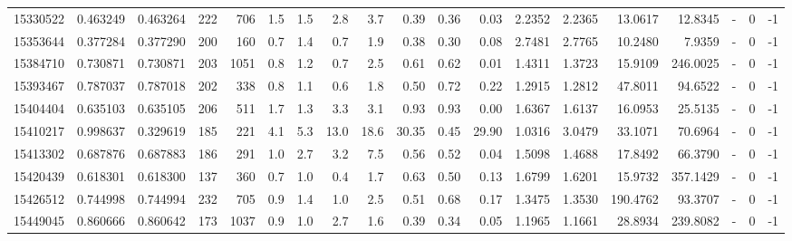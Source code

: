 \begin{tabular}{rrrrrrrrrrrrrrrrlrr}
  15330522 & 0.463249 &   0.463264 &  222 &  706 &      1.5 &      1.5 &     2.8 &      3.7 &       0.39 &        0.36 &        0.03 &  2.2352 &  2.2365 &   13.0617 &   12.8345 &             - &        0 &         -1 \\
  15353644 & 0.377284 &   0.377290 &  200 &  160 &      0.7 &      1.4 &     0.7 &      1.9 &       0.38 &        0.30 &        0.08 &  2.7481 &  2.7765 &   10.2480 &    7.9359 &             - &        0 &         -1 \\
  15384710 & 0.730871 &   0.730871 &  203 & 1051 &      0.8 &      1.2 &     0.7 &      2.5 &       0.61 &        0.62 &        0.01 &  1.4311 &  1.3723 &   15.9109 &  246.0025 &             - &        0 &         -1 \\
  15393467 & 0.787037 &   0.787018 &  202 &  338 &      0.8 &      1.1 &     0.6 &      1.8 &       0.50 &        0.72 &        0.22 &  1.2915 &  1.2812 &   47.8011 &   94.6522 &             - &        0 &         -1 \\
  15404404 & 0.635103 &   0.635105 &  206 &  511 &      1.7 &      1.3 &     3.3 &      3.1 &       0.93 &        0.93 &        0.00 &  1.6367 &  1.6137 &   16.0953 &   25.5135 &             - &        0 &         -1 \\
  15410217 & 0.998637 &   0.329619 &  185 &  221 &      4.1 &      5.3 &    13.0 &     18.6 &      30.35 &        0.45 &       29.90 &  1.0316 &  3.0479 &   33.1071 &   70.6964 &             - &        0 &         -1 \\
  15413302 & 0.687876 &   0.687883 &  186 &  291 &      1.0 &      2.7 &     3.2 &      7.5 &       0.56 &        0.52 &        0.04 &  1.5098 &  1.4688 &   17.8492 &   66.3790 &             - &        0 &         -1 \\
  15420439 & 0.618301 &   0.618300 &  137 &  360 &      0.7 &      1.0 &     0.4 &      1.7 &       0.63 &        0.50 &        0.13 &  1.6799 &  1.6201 &   15.9732 &  357.1429 &             - &        0 &         -1 \\
  15426512 & 0.744998 &   0.744994 &  232 &  705 &      0.9 &      1.4 &     1.0 &      2.5 &       0.51 &        0.68 &        0.17 &  1.3475 &  1.3530 &  190.4762 &   93.3707 &             - &        0 &         -1 \\
  15449045 & 0.860666 &   0.860642 &  173 & 1037 &      0.9 &      1.0 &     2.7 &      1.6 &       0.39 &        0.34 &        0.05 &  1.1965 &  1.1661 &   28.8934 &  239.8082 &             - &        0 &         -1 \\

\end{tabular}
